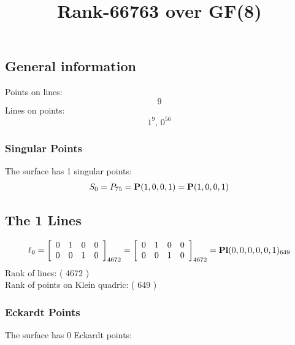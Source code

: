 \documentclass{article}
\newcommand\setTBstruts{\def\T{\rule{0pt}{2.6ex}}%
\def\B{\rule[-1.2ex]{0pt}{0pt}}}
\newcommand{\bP}{{\bf P}}
\begin{document}
 
\setTBstruts



{\allowdisplaybreaks%






\title{Rank-66763 over GF(8)}
\author{}%
\maketitle%
%
{}



\subsection*{General information}
Points on lines:
$$
9$$
Lines on points:
$$
1^9,\,0^{56}$$
\subsubsection*{Singular Points}
The surface has 1 singular points:\\
\begin{align*}
S_{0} &= P_{75}=\bP(1, 0, 0, 1) = \bP(1, 0, 0, 1)\\
\end{align*}
\subsection*{The 1 Lines}
$$
\ell_{0} = 
\left[
\begin{array}{*{4}{r}}
0 & 1 & 0 & 0\\
0 & 0 & 1 & 0\\
\end{array}
\right]
_{4672}
=
\left[
\begin{array}{*{4}c}
0  & 1  & 0  & 0\\
0  & 0  & 1  & 0\\
\end{array}
\right]_{4672}
={\rm\bf Pl}(0,0,0,0,0,1 )_{649}$$
Rank of lines: ( 4672 )\\
Rank of points on Klein quadric: ( 649 )\\
\subsubsection*{Eckardt Points}
The surface has 0 Eckardt points:\\
}
\end{document}
